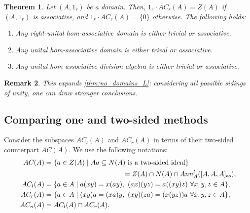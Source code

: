 \documentclass[12pt]{article}
\newtheorem{theorem}{Theorem}
\newtheorem{remark}[theorem]{Remark}
\begin{document}
		\begin{theorem}
			Let $(A,1_r)$ be a domain. Then, $1_r\cdot AC_r(A)=Z(A)$ if $(A,1_r)$ is associative, and $1_r\cdot AC_r(A)=\{0\}$ otherwise. The following holds:
			\begin{enumerate}[label=\textnormal{\arabic*)},ref=\textnormal{\arabic*)}]
				\item Any right-unital hom-associative domain is either trivial or associative.
				\item Any unital hom-associative domain is either trival or associative.
				\item Any unital hom-associative division algebra is either trivial or associative.
			\end{enumerate}
		\end{theorem}
		\begin{remark}
			This expands \cref{thm:no_domains_L}: considering all possible sidings of unity, one can draw stronger conclusions.
		\end{remark}
		
		
		\subsection{Comparing one and two-sided methods}\label{ssec:comparing}
		
		Consider the subspaces $AC_l(A)$ and $AC_r(A)$ in terms of their two-sided counterpart $AC(A)$. We use the following notations:
		\begin{align*}
			AC(A)&=\{a\in Z(A)\mid Aa\subseteq N(A) \textnormal{ is a two-sided ideal}\} \\
			&\hspace{4cm}=Z(A)\cap N(A)\cap Ann_A^l([A,A,A]_{\mathrm{as}}),\\
			AC_l(A)&=\{a\in A\mid a(xy)=x(ay),\ (ax)(yz)=a((xy)z)\ \forall x,y,z\in A  \},\\
			AC_r(A)&=\{a\in A\mid (xy)a=(xa)y,\ (xy)(za)=(x(yz))a\ \forall x,y,z\in A  \},\\
			AC_n(A)&=AC_l(A)\cap AC_r(A).
		\end{align*}
		
\end{document}
